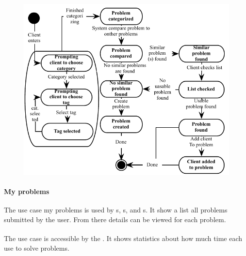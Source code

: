 \begin{figure}[htbp]
\begin{center}
 \includegraphics[scale=0.8]{input/application_domain_analysis/submit_problem_use_case}
\label{fig:submit_problem_use_case}
\end{center}
\end{figure}

\paragraph{My problems} The use case my problems is used by  \aclient s, \astaff s, and \admin s. It show a list all problems submitted by the user. From there details can be viewed for each problem. 


\paragraph{\gstat[c]} The use case \gstat[] is accessible by the \admin[]. It shows statistics about how much time each \astaff[] use to solve problems.

